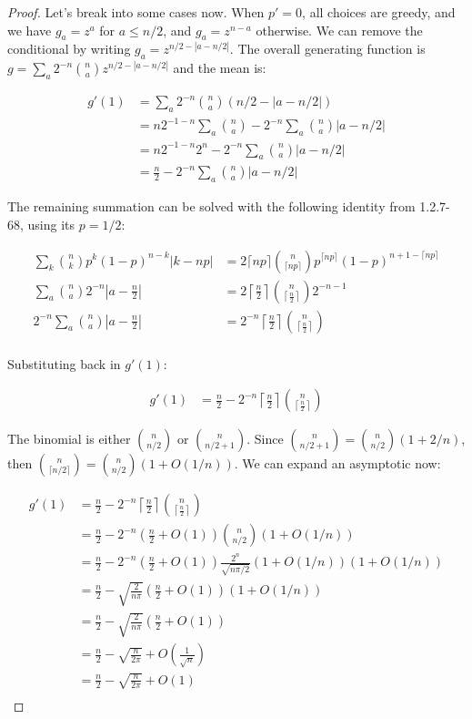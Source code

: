 \documentclass[10pt]{book}
\begin{document}
\begin{proof}
  Let's break into some cases now. When $p'=0$, all choices are greedy, and we have $g_a=z^a$ for $a\le n/2$, and $g_a=z^{n-a}$ otherwise. We can remove the conditional by writing $g_a=z^{n/2-\left|a-n/2\right|}$. The overall generating function is $g=\sum_a 2^{-n}{n\choose a}z^{n/2-\left|a-n/2\right|}$ and the mean is:

\begin{align*}
  g'(1) 
  &= \sum_a 2^{-n}{n\choose a}\left(n/2-\left|a-n/2\right|\right) \\
  &= n2^{-1-n}\sum_a{n\choose a} - 2^{-n}\sum_a{n\choose a}\left|a-n/2\right| \\
  &= n2^{-1-n}2^n - 2^{-n}\sum_a{n\choose a}\left|a-n/2\right| \\
  &= \frac{n}{2} - 2^{-n}\sum_a{n\choose a}\left|a-n/2\right|
\end{align*}

The remaining summation can be solved with the following identity from 1.2.7-68, using its $p=1/2$:
\newcommand{\mceil}{\left\lceil\frac{n}{2}\right\rceil}

\begin{align*}
  \sum_k{n\choose k}p^k(1-p)^{n-k}\left|k-np\right|&=2\lceil np\rceil {n\choose\lceil np\rceil}p^{\lceil np\rceil}(1-p)^{n+1-\lceil np \rceil} \\
  \sum_a{n\choose a}2^{-n}\left|a-\frac{n}{2}\right|&=2\mceil {n\choose\mceil}2^{-n-1} \\
  2^{-n} \sum_a{n\choose a}\left|a-\frac{n}{2}\right|&=2^{-n}\mceil {n\choose\mceil} \\
\end{align*}

Substituting back in $g'(1)$:

\begin{align*}
  g'(1) &= \frac{n}{2}-2^{-n}\mceil{n\choose\mceil}
\end{align*}

The binomial is either ${n\choose n/2}$ or ${n\choose n/2+1}$. Since ${n\choose n/2+1}={n\choose n/2}(1+2/n)$, then ${n\choose\lceil n/2\rceil}={n\choose n/2}(1+O(1/n))$. We can expand an asymptotic now:

\begin{align*}
  g'(1) &= \frac{n}{2}-2^{-n}\mceil{n\choose\mceil} \\
    &= \frac{n}{2}-2^{-n}\left(\frac{n}{2}+O(1)\right)
      {n\choose n/2}\left(1+O(1/n)\right) \\
    &= \frac{n}{2}-2^{-n}\left(\frac{n}{2}+O(1)\right)
      \frac{2^n}{\sqrt{n\pi/2}}\left(1+O(1/n)\right)\left(1+O(1/n)\right) \\
      &= \frac{n}{2}-\sqrt{\frac{2}{n\pi}}\left(\frac{n}{2}+O(1)\right)
      \left(1+O(1/n)\right) \\
      &= \frac{n}{2}-\sqrt{\frac{2}{n\pi}}\left(\frac{n}{2}+O(1)\right)\\
      &= \frac{n}{2}-\sqrt{\frac{n}{2\pi}}+O\left(\frac{1}{\sqrt{n}}\right) \\
      &= \frac{n}{2}-\sqrt{\frac{n}{2\pi}}+O\left(1\right) \\
\end{align*}


\end{proof}
\end{document}
